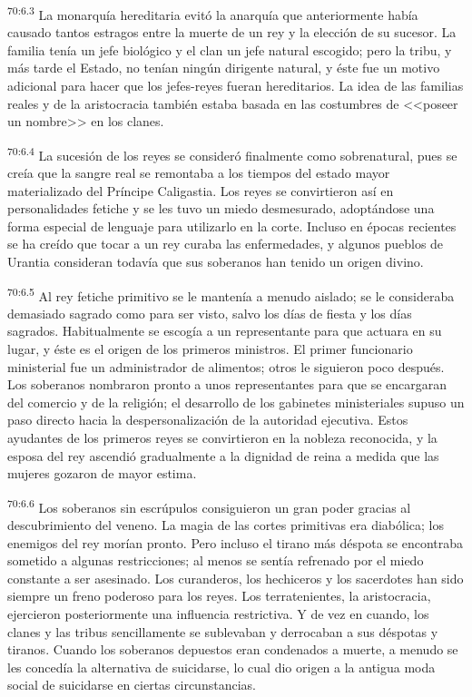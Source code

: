\documentclass[twoside, 11pt]{book}
\begin{document}
\par
\textsuperscript{70:6.3} La monarquía hereditaria evitó la anarquía que anteriormente había causado tantos estragos entre la muerte de un rey y la elección de su sucesor. La familia tenía un jefe biológico y el clan un jefe natural escogido; pero la tribu, y más tarde el Estado, no tenían ningún dirigente natural, y éste fue un motivo adicional para hacer que los jefes-reyes fueran hereditarios. La idea de las familias reales y de la aristocracia también estaba basada en las costumbres de <<poseer un nombre>> en los clanes.

\par
\textsuperscript{70:6.4} La sucesión de los reyes se consideró finalmente como sobrenatural, pues se creía que la sangre real se remontaba a los tiempos del estado mayor materializado del Príncipe Caligastia. Los reyes se convirtieron así en personalidades fetiche y se les tuvo un miedo desmesurado, adoptándose una forma especial de lenguaje para utilizarlo en la corte. Incluso en épocas recientes se ha creído que tocar a un rey curaba las enfermedades, y algunos pueblos de Urantia consideran todavía que sus soberanos han tenido un origen divino.

\par
\textsuperscript{70:6.5} Al rey fetiche primitivo se le mantenía a menudo aislado; se le consideraba demasiado sagrado como para ser visto, salvo los días de fiesta y los días sagrados. Habitualmente se escogía a un representante para que actuara en su lugar, y éste es el origen de los primeros ministros. El primer funcionario ministerial fue un administrador de alimentos; otros le siguieron poco después. Los soberanos nombraron pronto a unos representantes para que se encargaran del comercio y de la religión; el desarrollo de los gabinetes ministeriales supuso un paso directo hacia la despersonalización de la autoridad ejecutiva. Estos ayudantes de los primeros reyes se convirtieron en la nobleza reconocida, y la esposa del rey ascendió gradualmente a la dignidad de reina a medida que las mujeres gozaron de mayor estima.

\par
\textsuperscript{70:6.6} Los soberanos sin escrúpulos consiguieron un gran poder gracias al descubrimiento del veneno. La magia de las cortes primitivas era diabólica; los enemigos del rey morían pronto. Pero incluso el tirano más déspota se encontraba sometido a algunas restricciones; al menos se sentía refrenado por el miedo constante a ser asesinado. Los curanderos, los hechiceros y los sacerdotes han sido siempre un freno poderoso para los reyes. Los terratenientes, la aristocracia, ejercieron posteriormente una influencia restrictiva. Y de vez en cuando, los clanes y las tribus sencillamente se sublevaban y derrocaban a sus déspotas y tiranos. Cuando los soberanos depuestos eran condenados a muerte, a menudo se les concedía la alternativa de suicidarse, lo cual dio origen a la antigua moda social de suicidarse en ciertas circunstancias.
\end{document}
